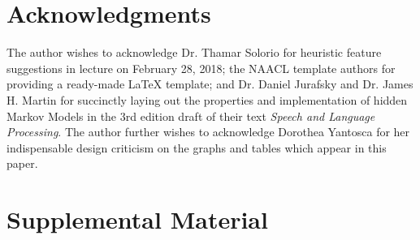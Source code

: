 \documentclass[11pt,a4paper]{article}
\begin{document}
\section*{Acknowledgments}

The author wishes to acknowledge Dr. Thamar Solorio for heuristic feature suggestions in
lecture on February 28, 2018; the NAACL template authors for providing a ready-made
{\LaTeX} template; and Dr. Daniel Jurafsky and Dr. James H. Martin for succinctly laying out the
properties and implementation of hidden Markov Models in the 3rd edition draft of their
text \emph{Speech and Language Processing}. The author further wishes to acknowledge
Dorothea Yantosca for her indispensable design criticism on the graphs and tables
which appear in this paper.




\appendix

\section{Supplemental Material}
\label{sec:supplemental}
\end{document}
